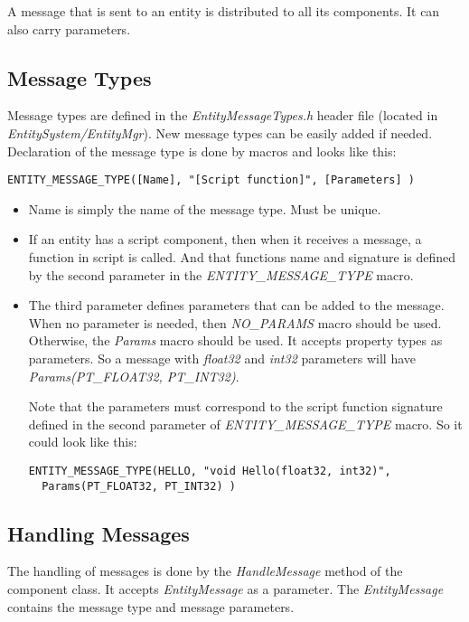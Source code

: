 \documentclass[a4paper, 12pt]{report}
\begin{document}
A message that is sent to an entity is distributed to all its components. It can also carry parameters.

\subsection{Message Types}
Message types are defined in the \emph{EntityMessageTypes.h} header file (located in \emph{EntitySystem/EntityMgr}). New message types can be easily added if needed. Declaration of the message type is done by macros and looks like this:

\footnotesize 
\begin{verbatim}
ENTITY_MESSAGE_TYPE([Name], "[Script function]", [Parameters] )
\end{verbatim}
\normalsize

\begin{itemize}
\item
Name is simply the name of the message type. Must be unique.
\item
If an entity has a script component, then when it receives a message, a function in script is called. And that functions name and signature is defined by the second parameter in the \emph{ENTITY\_MESSAGE\_TYPE} macro.
\item
The third parameter defines parameters that can be added to the message. When no parameter is needed, then \emph{NO\_PARAMS} macro should be used. Otherwise, the \emph{Params} macro should be used. It accepts property types as parameters. So a message with  \emph{float32} and  \emph{int32} parameters will have \emph{Params(PT\_FLOAT32, PT\_INT32)}.

Note that the parameters must correspond to the script function signature defined in the second parameter of \emph{ENTITY\_MESSAGE\_TYPE} macro. So it could look like this: 

\footnotesize 
\begin{verbatim}
ENTITY_MESSAGE_TYPE(HELLO, "void Hello(float32, int32)",
  Params(PT_FLOAT32, PT_INT32) )
\end{verbatim}
\normalsize

\end{itemize}

\subsection{Handling Messages}

 The handling of messages is done by the \emph{HandleMessage} method of the component class. It accepts \emph{EntityMessage} as a parameter. The \emph{EntityMessage} contains the message type and message parameters. 
\end{document}
